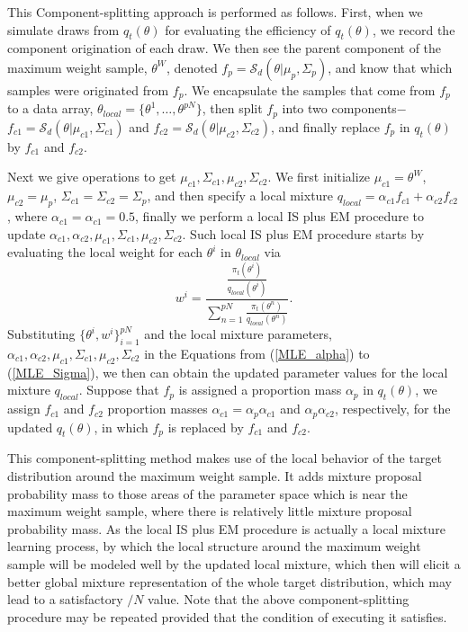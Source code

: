 This Component-splitting approach is performed as follows. First,
when we simulate draws from $q_t(\theta)$ for evaluating the
efficiency of $q_t(\theta)$, we record the component origination of
each draw. We then see the parent component of the maximum weight
sample, $\theta^W$, denoted
$f_p=\mathcal{S}_d(\theta|\mu_p,\Sigma_p)$, and know that which
samples were originated from $f_p$. We encapsulate the samples that
come from $f_p$ to a data array,
$\mathcal{\theta}_{local}=\{\theta^{1},\ldots,\theta^{pN}\}$, then
split $f_p$ into two components$-$
$f_{c1}=\mathcal{S}_d(\theta|\mu_{c1},\Sigma_{c1})$ and
$f_{c2}=\mathcal{S}_d(\theta|\mu_{c2},\Sigma_{c2})$, and finally
replace $f_p$ in $q_t(\theta)$ by $f_{c1}$ and $f_{c2}$.

Next we give operations to get
$\mu_{c1},\Sigma_{c1},\mu_{c2},\Sigma_{c2}$. We first initialize
$\mu_{c1}=\theta^W$, $\mu_{c2}=\mu_p$,
$\Sigma_{c1}=\Sigma_{c2}=\Sigma_p$, and then specify a local mixture
$q_{local}=\alpha_{c1}f_{c1}+\alpha_{c2}f_{c2}$, where
$\alpha_{c1}=\alpha_{c1}=0.5$, finally we perform a local IS plus EM
procedure to update
$\alpha_{c1},\alpha_{c2},\mu_{c1},\Sigma_{c1},\mu_{c2},\Sigma_{c2}$.
Such local IS plus EM procedure starts by evaluating the local
weight for each $\theta^{i}$ in $\mathcal{\theta}_{local}$ via
\begin{equation}
w^i=\frac{\frac{\pi_{t}(\theta^{i})}{q_{local}(\theta^{i})}}{\sum_{n=1}^{pN}\frac{\pi_{t}(\theta^n)}{q_{local}(\theta^n)}}.
\end{equation}
Substituting $\{\theta^i,w^i\}_{i=1}^{pN}$ and the local mixture
parameters,
$\alpha_{c1},\alpha_{c2},\mu_{c1},\Sigma_{c1},\mu_{c2},\Sigma_{c2}$
in the Equations from (\ref{MLE_alpha}) to (\ref{MLE_Sigma}), we
then can obtain the updated parameter values for the local mixture
$q_{local}$. Suppose that $f_p$ is assigned a proportion mass
$\alpha_p$ in $q_t(\theta)$, we assign $f_{c1}$ and $f_{c2}$
proportion masses $\alpha_{c1}=\alpha_p\alpha_{c1}$ and
$\alpha_p\alpha_{c2}$, respectively, for the updated $q_t(\theta)$,
in which $f_p$ is replaced by $f_{c1}$ and $f_{c2}$.

This component-splitting method makes use of the local behavior of
the target distribution around the maximum weight sample. It adds
mixture proposal probability mass to those areas of the parameter
space which is near the maximum weight sample, where there is
relatively little mixture proposal probability mass. As the local IS
plus EM procedure is actually a local mixture learning process, by
which the local structure around the maximum weight sample will be
modeled well by the updated local mixture, which then will elicit a
better global mixture representation of the whole target
distribution, which may lead to a satisfactory \ESS$/N$ value. Note
that the above component-splitting procedure may be repeated
provided that the condition of executing it satisfies.

